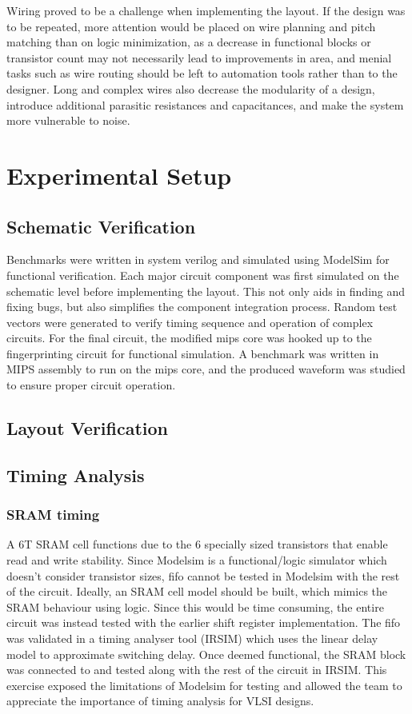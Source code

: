 \documentclass[12pt,journal,compsoc]{IEEEtran}
\begin{document}
Wiring proved to be a challenge when implementing the layout. If the design was to be repeated, more attention would be placed on wire planning and pitch matching than on logic minimization, as a decrease in functional blocks or transistor count may not necessarily lead to improvements in area, and menial tasks such as wire routing should be left to automation tools rather than to the designer. Long and complex wires also decrease the modularity of a design, introduce additional parasitic resistances and capacitances, and make the system more vulnerable to noise.


\section{Experimental Setup}
\subsection{Schematic Verification}
Benchmarks were written in system verilog and simulated using ModelSim for functional verification. Each major circuit component was first simulated on the schematic level before implementing the layout. This not only aids in finding and fixing bugs, but also simplifies the component integration process. Random test vectors were generated to verify timing sequence and operation of complex circuits.
For the final circuit, the modified mips core was hooked up to the fingerprinting circuit for functional simulation. A benchmark was written in MIPS assembly to run on the mips core, and the produced waveform was studied to ensure proper circuit operation. 

\subsection{Layout Verification}
\subsection{Timing Analysis}
\subsubsection {SRAM timing}
A 6T SRAM cell functions due to the 6 specially sized transistors that enable read and write stability. Since Modelsim is a functional/logic simulator which doesn’t consider transistor sizes, fifo cannot be tested in Modelsim with the rest of the circuit. Ideally, an SRAM cell model should be built, which mimics the SRAM behaviour using logic. Since this would be time consuming, the entire circuit was instead tested with the earlier shift register implementation. The fifo was validated in a timing analyser tool (IRSIM) which uses the linear delay model to approximate switching delay. Once deemed functional, the SRAM block was connected to and tested along with the rest of the circuit in IRSIM. This exercise exposed the limitations of Modelsim for testing and allowed the team to appreciate the importance of timing analysis for VLSI designs.
\end{document}
